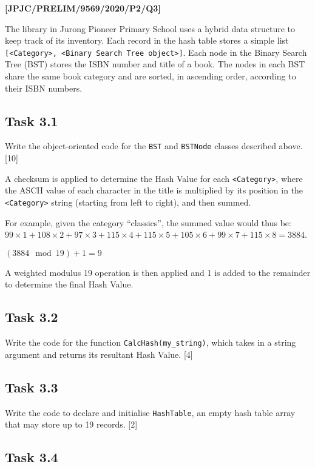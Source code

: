 \item \textbf{{[}JPJC/PRELIM/9569/2020/P2/Q3{]} }

The library in Jurong Pioneer Primary School uses a hybrid data structure
to keep track of its inventory. Each record in the hash table stores
a simple list \texttt{{[}<Category>, <Binary Search Tree object>{]}}.
Each node in the Binary Search Tree (BST) stores the ISBN number and
title of a book. The nodes in each BST share the same book category
and are sorted, in ascending order, according to their ISBN numbers. 

\subsection*{Task 3.1 }

Write the object-oriented code for the \texttt{BST} and \texttt{BSTNode}
classes described above. \hfill{}{[}10{]}

A checksum is applied to determine the Hash Value for each \texttt{<Category>},
where the ASCII value of each character in the title is multiplied
by its position in the \texttt{<Category>} string (starting from left
to right), and then summed. 

For example, given the category \textquotedblleft classics\textquotedblright ,
the summed value would thus be: $99\times1+108\times2+97\times3+115\times4+115\times5+105\times6+99\times7+115\times8=3884$.

$(3884\mod19)+1=9$

A weighted modulus 19 operation is then applied and 1 is added to
the remainder to determine the final Hash Value. 

\subsection*{Task 3.2 }

Write the code for the function \texttt{CalcHash(my\_string)}, which
takes in a string argument and returns its resultant Hash Value. \hfill{}{[}4{]}

\subsection*{Task 3.3 }

Write the code to declare and initialise \texttt{HashTable}, an empty
hash table array that may store up to 19 records. {[}2{]} 

\subsection*{Task 3.4 }

